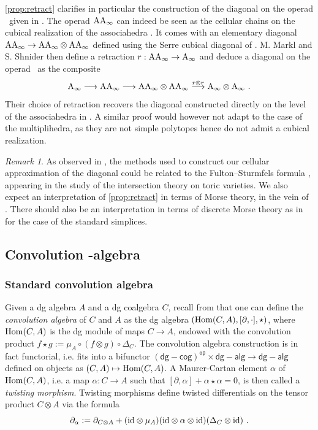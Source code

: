 \documentclass[10pt]{amsart}
\theoremstyle{remark}
\newtheorem{remark}[definition]{\sc Remark}
\begin{document}
\cref{prop:retract} clarifies in particular the construction of the diagonal on the operad \Ainf\ given in \cite{MarklShnider06}. 
The operad $\mathrm{AA}_\infty$ can indeed be seen as the cellular chains on the cubical realization of the associahedra \cite[Section 9.3.1]{LodayVallette12}. 
It comes with an elementary diagonal $\mathrm{AA}_\infty \rightarrow \mathrm{AA}_\infty \otimes \mathrm{AA}_\infty$ defined using the Serre cubical diagonal of \cite{Serre51}.
M. Markl and S. Shnider then define a retraction $r:\mathrm{AA}_\infty \rightarrow \mathrm{A}_\infty$ and deduce a diagonal on the operad \Ainf\ as the composite
\[ \mathrm{A}_\infty \longrightarrow \mathrm{AA}_\infty \longrightarrow \mathrm{AA}_\infty \otimes \mathrm{AA}_\infty \overset{r \otimes r}{\longrightarrow} \mathrm{A}_\infty \otimes \mathrm{A}_\infty \ . \]
Their choice of retraction recovers the diagonal constructed directly on the level of the associahedra in \cite[Theorem 2]{MTTV19}.
A similar proof would however not adapt to the case of the multiplihedra, as they are not simple polytopes hence do not admit a cubical realization.

\begin{remark}
\label{rem:Morse}
As observed in \cite[Remark 1.6]{LA21}, the methods used to construct our cellular approximation of the diagonal could be related to the Fulton--Sturmfels formula \cite[Theorem 4.2]{FultonSturmfels97}, appearing in the study of the intersection theory on toric varieties.
We also expect an interpretation of \cref{prop:retract} in terms of Morse theory, in the vein of \cite{FriedmanMardonesSinha21,Frankland07}. 
There should also be an interpretation in terms of discrete Morse theory as in \cite[Section 1.1.4]{Thorngren18} for the case of the standard simplices.  
\end{remark}

\subsection{Convolution \Ainf -algebra} \label{ss:conv-ainf-alg}

\subsubsection{Standard convolution algebra}

Given a dg algebra $A$ and a dg coalgebra $C$, recall from  \cite[Section 1.6]{LodayVallette12} that one can define the \textit{convolution algebra} of $C$ and $A$ as the dg algebra $(\mathrm{Hom} (C,A) , [ \partial , \cdot ] , \star)$, where $\mathrm{Hom} (C,A)$
is the dg module of maps $C \rightarrow A$, endowed with the convolution product $f \star g := \mu_A \circ ( f \otimes g) \circ \Delta_C$. 
The convolution algebra construction is in fact functorial, i.e. fits into a bifunctor $\mathsf{(dg-cog)^{op}} \times \mathsf{dg-alg} \rightarrow \mathsf{dg-alg}$ defined on objects as $(C,A) \mapsto \mathrm{Hom} (C,A)$.
A Maurer-Cartan element $\alpha$ of $\mathrm{Hom} (C,A)$, i.e. a map $\alpha : C \rightarrow A$ such that 
$[ \partial , \alpha ] + \alpha \star \alpha  = 0$,
is then called a \emph{twisting morphism}. 
Twisting morphisms define twisted differentials on the tensor product $C \otimes A$ via the formula
\[ \partial_\alpha := \partial_{C \otimes A} + (\mathrm{id} \otimes \mu_A ) ( \mathrm{id} \otimes \alpha \otimes \mathrm{id} ) ( \Delta_C \otimes \mathrm{id} ) \ . \]
\end{document}
